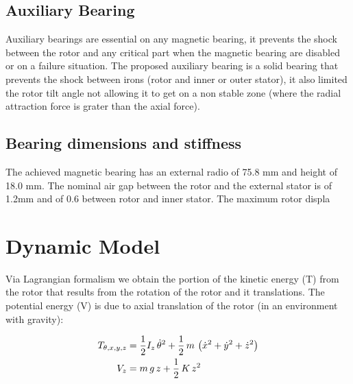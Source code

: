 \documentclass[10pt,fleqn,a4paper,twoside]{article}
\begin{document}
\subsection{Auxiliary Bearing}

Auxiliary bearings are essential on any magnetic bearing, it prevents the shock between the rotor and any critical part when the magnetic bearing are disabled or on a failure situation. The proposed auxiliary bearing is a solid bearing that prevents the shock between irons (rotor and inner or outer stator), it also limited the rotor tilt angle not allowing it to get on a non stable zone (where the radial attraction force is grater than the axial force). 



\subsection{Bearing dimensions and stiffness}

The achieved magnetic bearing has an external radio of 75.8 mm and height of 18.0 mm. The nominal air gap between the rotor and the external stator is of 1.2mm and of 0.6 between rotor and inner stator. The maximum rotor displa

\section{Dynamic Model}

Via Lagrangian formalism we obtain the portion of the kinetic energy (T) from the rotor that results from the rotation of the rotor and it translations. The potential energy (V) is due to axial translation of the rotor (in an environment with gravity): 

 \begin{align}
 	T_{\theta, x, y, z} &= \frac{1}{2} I_z \, \dot{\theta}^2 + \frac{1}{2} \, m \, \left( \dot{x}^2 + \dot{y}^2 + \dot{z}^2 \right) \notag \\
 	V_z &= m \, g \, z + \frac{1}{2} \, K \, z^2
 \end{align}
 
\end{document}
